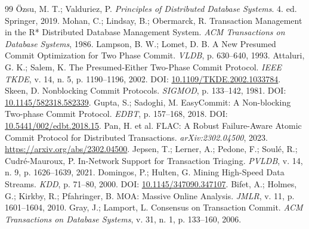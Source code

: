 \documentclass[12pt,a4paper]{article}
\begin{document}
\begin{thebibliography}{99}
 Özsu, M. T.; Valduriez, P. \textit{Principles of Distributed Database Systems}. 4. ed. Springer, 2019.
 Mohan, C.; Lindsay, B.; Obermarck, R. Transaction Management in the R* Distributed Database Management System. \textit{ACM Transactions on Database Systems}, 1986.
 Lampson, B. W.; Lomet, D. B. A New Presumed Commit Optimization for Two Phase Commit. \textit{VLDB}, p. 630--640, 1993.
 Attaluri, G. K.; Salem, K. The Presumed-Either Two-Phase Commit Protocol. \textit{IEEE TKDE}, v. 14, n. 5, p. 1190--1196, 2002. DOI: \href{https://doi.org/10.1109/TKDE.2002.1033784}{10.1109/TKDE.2002.1033784}.
 Skeen, D. Nonblocking Commit Protocols. \textit{SIGMOD}, p. 133--142, 1981. DOI: \href{https://doi.org/10.1145/582318.582339}{10.1145/582318.582339}.
 Gupta, S.; Sadoghi, M. EasyCommit: A Non-blocking Two-phase Commit Protocol. \textit{EDBT}, p. 157--168, 2018. DOI: \href{https://doi.org/10.5441/002/edbt.2018.15}{10.5441/002/edbt.2018.15}.
 Pan, H. et al. FLAC: A Robust Failure-Aware Atomic Commit Protocol for Distributed Transactions. \textit{arXiv:2302.04500}, 2023. \url{https://arxiv.org/abs/2302.04500}.
 Jepsen, T.; Lerner, A.; Pedone, F.; Soulé, R.; Cudré-Mauroux, P. In-Network Support for Transaction Triaging. \textit{PVLDB}, v. 14, n. 9, p. 1626--1639, 2021.
 Domingos, P.; Hulten, G. Mining High-Speed Data Streams. \textit{KDD}, p. 71--80, 2000. DOI: \href{https://doi.org/10.1145/347090.347107}{10.1145/347090.347107}.
 Bifet, A.; Holmes, G.; Kirkby, R.; Pfahringer, B. MOA: Massive Online Analysis. \textit{JMLR}, v. 11, p. 1601--1604, 2010.
 Gray, J.; Lamport, L. Consensus on Transaction Commit. \textit{ACM Transactions on Database Systems}, v. 31, n. 1, p. 133--160, 2006.
\end{thebibliography}
\end{document}
